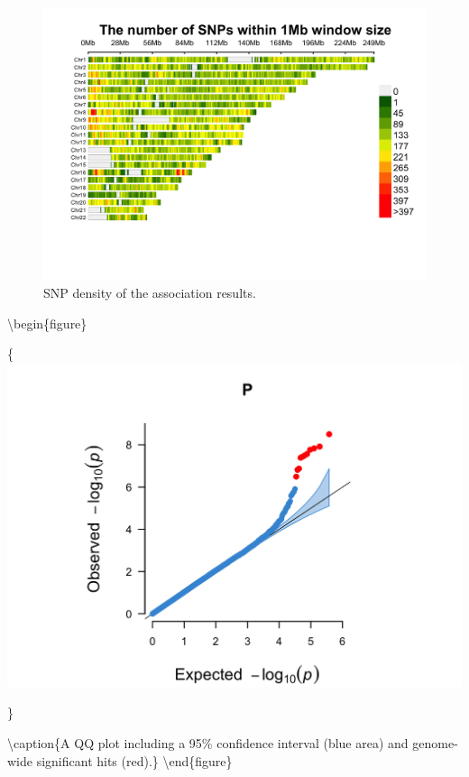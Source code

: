 \documentclass[
]{book}
\begin{document}
\begin{figure}

{\centering \includegraphics[width=18.67in]{img/_gwas/WTCCC1ResultsManhattan-density} 

}

\caption{SNP density of the association results.}\label{fig:show-wtccc1-graphs-density}
\end{figure}

\textbackslash begin\{figure\}

\{\centering \includegraphics[width=18.67in]{img/_gwas/WTCCC1ResultsManhattan-qq}

\}

\textbackslash caption\{A QQ plot including a 95\% confidence interval (blue area) and genome-wide significant hits (red).\}\label{fig:show-wtccc1-graphs-qq}
\textbackslash end\{figure\}
\end{document}
